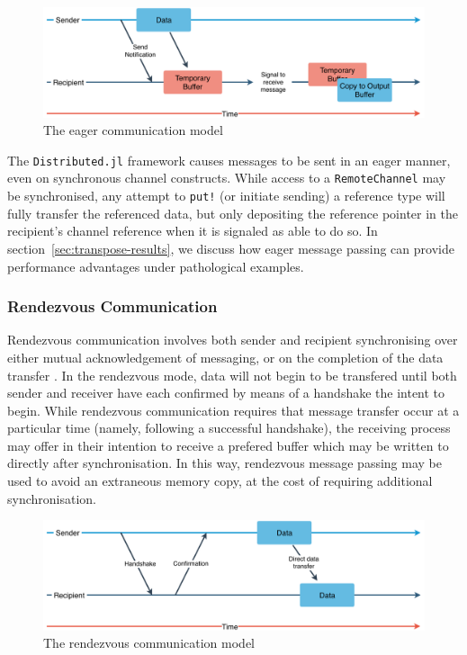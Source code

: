 \begin{figure}[htb]
  \includegraphics[width=\linewidth]{figs/Eager.pdf}
  \caption{The eager communication model}
  \label{fig:eager}
\end{figure}

The \texttt{Distributed.jl} framework causes messages to be sent in an
eager manner, even on synchronous channel constructs. While access to a
\texttt{RemoteChannel} may be synchronised, any attempt to \texttt{put!}
(or initiate sending) a reference type will fully transfer the
referenced data, but only depositing the reference pointer in the
recipient's channel reference when it is signaled as able to do so. In
section~\ref{sec:transpose-results}, we discuss how eager message
passing can provide performance advantages under pathological examples.

\subsubsection{Rendezvous Communication}
\label{sec:rendezvous}

Rendezvous communication involves both sender and recipient
synchronising over either mutual acknowledgement of messaging, or on the
completion of the data transfer \cite{illinois, ompi}. In the rendezvous
mode, data will not begin to be transfered until both sender and
receiver have each confirmed by means of a handshake the intent to
begin. While rendezvous communication requires that message transfer
occur at a particular time (namely, following a successful handshake),
the receiving process may offer in their intention to receive a prefered
buffer which may be written to directly after synchronisation. In this
way, rendezvous message passing may be used to avoid an extraneous
memory copy, at the cost of requiring additional synchronisation.

\begin{figure}[htb]
  \includegraphics[width=\linewidth]{figs/Rendezvous.pdf}
  \caption{The rendezvous communication model}
  \label{fig:rendezvous}
\end{figure}

